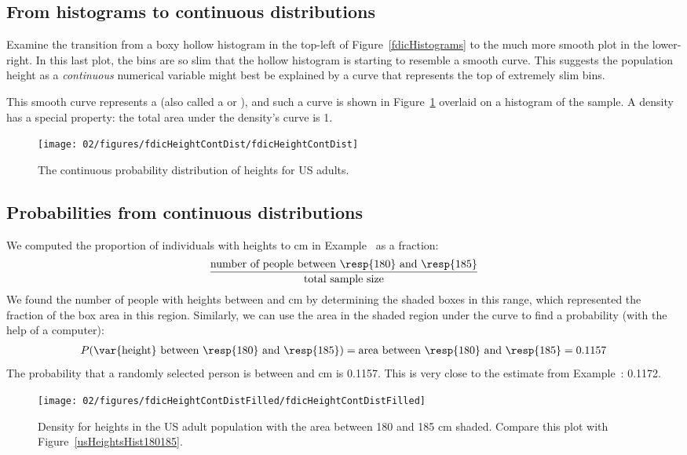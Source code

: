 \subsection{From histograms to continuous distributions}

Examine the transition from a boxy hollow histogram in the top-left of Figure~\ref{fdicHistograms} to the much more smooth plot in the lower-right. In this last plot, the bins are so slim that the hollow histogram is starting to resemble a smooth curve. This suggests the population height as a \emph{continuous} numerical variable might best be explained by a curve that represents the top of extremely slim bins.

This smooth curve represents a  (also called a  or ), and such a curve is shown in Figure~\ref{fdicHeightContDist} overlaid on a histogram of the sample. A density has a special property: the total area under the density's curve is 1. 
\begin{figure}[tbh]
\centering
\texttt{[image: 02/figures/fdicHeightContDist/fdicHeightContDist]}
\caption{The continuous probability distribution of heights for US adults.}
\label{fdicHeightContDist}
\end{figure}

\subsection{Probabilities from continuous distributions}

We computed the proportion of individuals with heights  to  cm in Example~ as a fraction:
\begin{eqnarray*}
\frac{\text{number of people between \resp{180} and \resp{185}}}{\text{total sample size}}
\end{eqnarray*}
We found the number of people with heights between  and  cm by determining the shaded boxes in this range, which represented the fraction of the box area in this region. Similarly, we can use the area in the shaded region under the curve to find a probability (with the help of a computer):
\begin{eqnarray*}
P(\text{\var{height} between \resp{180} and \resp{185}})
	= \text{area between \resp{180} and \resp{185}}
	= 0.1157
\end{eqnarray*}
The probability that a randomly selected person is between  and  cm is 0.1157. This is very close to the estimate from Example~: 0.1172. 
\begin{figure}
\centering
\texttt{[image: 02/figures/fdicHeightContDistFilled/fdicHeightContDistFilled]}
\caption{Density for heights in the US adult population with the area between 180 and 185 cm shaded. Compare this plot with Figure~\ref{usHeightsHist180185}.}
\label{fdicHeightContDistFilled}
\end{figure}

